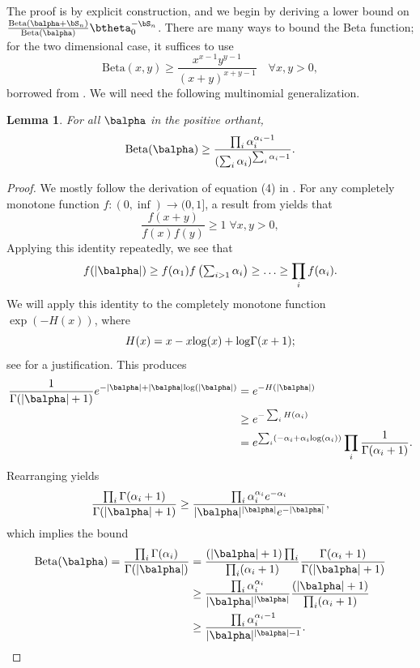 \documentclass[11pt]{article}
\def\log{{\rm log}}
\newcommand{\Beta}{\mathrm{Beta}}
\newtheorem{lemma}{Lemma}[section]
\begin{document}
The proof is by explicit construction, and we begin by deriving a lower bound on 
$
 \frac{\Beta(\balpha + \bS_n)} {\Beta(\balpha)} \btheta_0 ^{-\bS_n}
$.
There are many ways to bound the Beta function; for the two dimensional case, it suffices to use
\begin{equation}\label{eq:Beta.lower.bound}
  \Beta(x,y) \geq \frac{x^{x-1}y^{y-1}}
  {(x+y)^{x+y-1}}\quad\forall x,y>0,
\end{equation}
borrowed from \cite{grenie2015inequalities}.
We will need the following multinomial generalization.
\begin{lemma}\label{lem:beta.lower.bound}
  For all $\balpha$ in the positive orthant,
  \begin{equation*}
    \Beta(\balpha) \geq
    \frac{ \prod_i \alpha_i^{\alpha_i-1}}
    {(\sum_i \alpha_i)^{\sum_i \alpha_i-1}}.
  \end{equation*}
\end{lemma}
\begin{proof}
  We mostly follow the derivation of equation (4) in \cite{grenie2015inequalities}.
For any completely monotone function $f:(0,\inf)\rightarrow(0,1]$, a result from \cite{kimberling1974probabilistic} yields that
\[
  \frac{f(x+y)}{f(x)f(y)} \geq 1 \; \forall x,y>0,
\]
Applying this identity repeatedly, we see that
\[
  f(|\balpha|)
  \geq
  f(\alpha_1)f\left(\textstyle \sum_{i>1} \alpha_i\right)
  \geq \ldots\geq
  \prod_i f(\alpha_i).
\]
We will apply this identity to the completely monotone function $\exp(-H(x))$, where
\[
  H(x) = x - x\log(x) + \log\Gamma(x+1);
\]
see \cite{grenie2015inequalities} for a justification.
This produces
\begin{align*}
  \frac{1}{\Gamma(|\balpha|+1)}e^{-|\balpha|+|\balpha|\log(|\balpha|)}
  &=
  e^{-H\left(|\balpha|\right)}\\
  &\geq
    e^{-\sum_i H\left(\alpha_i\right)}\\
  &=
     e^{\sum_i\left(- \alpha_i + \alpha_i \log(\alpha_i)\right)}\prod_i\frac{1}{\Gamma(\alpha_i+1)}.
\end{align*}
Rearranging yields
\[
  \frac{\prod_i\Gamma(\alpha_i+1)}{\Gamma(|\balpha|+1)}
  \geq
  \frac{\prod_i \alpha_i^{\alpha_i}e^{-\alpha_i}}
  {|\balpha|^{|\balpha|}e^{-|\balpha|}},
\]
which implies the bound
\begin{align*}
  \Beta(\balpha)
  =
  \frac{\prod_i\Gamma(\alpha_i)}{\Gamma(|\balpha|)}
  &=
  \frac{(|\balpha|+1)\prod_i}
  {\prod_i (\alpha_i+1)}
   \frac{\Gamma(\alpha_i+1)}{\Gamma(|\balpha|+1)}\\
  &\geq
  \frac{\prod_i \alpha_i^{\alpha_i}}
  {|\balpha|^{|\balpha|}}
  \frac{(|\balpha|+1)}{\prod_i (\alpha_i+1)}\\
  &\geq
  \frac{\prod_i \alpha_i^{\alpha_i-1}}
  {|\balpha|^{|\balpha|-1}}.
\end{align*}
\end{proof}
\end{document}
